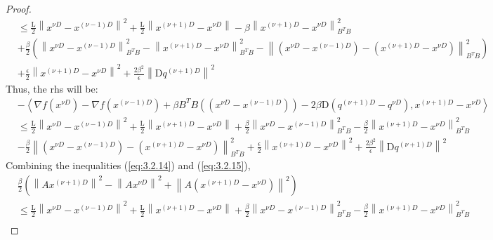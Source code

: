 \begin{proof}
\begin{equation*}
\begin{align}
                &\leq \frac{\mathrm{L}}{2} \left \lVert x^{\nu D} - x^{(\nu - 1)D}\right \rVert^2 + \frac{\mathrm{L}}{2}\left \lVert x^{(\nu + 1)D} - x^{\nu D}\right \rVert - \beta \left \lVert x^{(\nu + 1)D} - x^{\nu D}\right \rVert^2_{B^TB}\\
                 &+ \frac{\beta}{2} \left(\left \lVert x^{\nu D} - x^{(\nu - 1)D}\right \rVert^2_{B^TB} -\left \lVert x^{(\nu + 1)D} - x^{\nu D}\right \rVert^2_{B^TB} - \left \lVert(x^{\nu D} - x^{(\nu - 1)D}) - (x^{(\nu + 1)D} - x^{\nu D})\right \rVert^2_{B^TB}\right)\\&+ \frac{\epsilon}{2}\left \lVert x^{(\nu + 1)D} - x^{\nu D} \right \rVert ^2 + \frac{2 \beta^2}{\epsilon} \left \lVert \mathrm{D}q^{(\nu + 1)D} \right \rVert ^2
            \end{align}
        \end{equation*}
        Thus, the rhs will be:
        \begin{equation}\label{eq:3.2.15}
            \begin{align}
                 &- \left \langle \nabla f(x^{\nu D}) -  \nabla f(x^{(\nu - 1)D}) + \beta B^TB\left( \left(x^{\nu D} - x^{(\nu - 1)D} \right) \right) - 2\beta \mathrm{D}(q^{(\nu +1 )D} - q^{\nu D}), x^{(\nu + 1)D} - x^{\nu D} \right \rangle\\
                 &\leq \frac{\mathrm{L}}{2} \left \lVert x^{\nu D} - x^{(\nu - 1)D}\right \rVert^2 + \frac{\mathrm{L}}{2}\left \lVert x^{(\nu + 1)D} - x^{\nu D}\right \rVert + \frac{\beta}{2}\left \lVert x^{\nu D} - x^{(\nu - 1)D}\right \rVert^2_{B^TB} - \frac{\beta}{2}\left \lVert x^{(\nu + 1)D} - x^{\nu D}\right \rVert^2_{B^TB}\\
                 &- \frac{\beta}{2}\left \lVert(x^{\nu D} - x^{(\nu - 1)D}) - (x^{(\nu + 1)D} - x^{\nu D})\right \rVert^2_{B^TB} + \frac{\epsilon}{2}\left \lVert x^{(\nu + 1)D} - x^{\nu D} \right \rVert ^2 + \frac{2 \beta^2}{\epsilon} \left \lVert \mathrm{D}q^{(\nu + 1)D} \right \rVert ^2
            \end{align}
        \end{equation}
        Combining the inequalities (\ref{eq:3.2.14}) and (\ref{eq:3.2.15}),
        \begin{equation*}
            \begin{align}
                &\frac{\beta}{2} \left( \left \lVert Ax^{(\nu + 1)D} \right \rVert^2 - \left \lVert Ax^{\nu D} \right \rVert^2 + \left \lVert A(x^{(\nu + 1)D} - x^{\nu D}) \right \rVert^2\right)\\
                &\leq \frac{\mathrm{L}}{2} \left \lVert x^{\nu D} - x^{(\nu - 1)D}\right \rVert^2 + \frac{\mathrm{L}}{2}\left \lVert x^{(\nu + 1)D} - x^{\nu D}\right \rVert + \frac{\beta}{2}\left \lVert x^{\nu D} - x^{(\nu - 1)D}\right \rVert^2_{B^TB} - \frac{\beta}{2}\left \lVert x^{(\nu + 1)D} - x^{\nu D}\right \rVert^2_{B^TB}\\

\end{align}
\end{equation*}
\end{proof}
